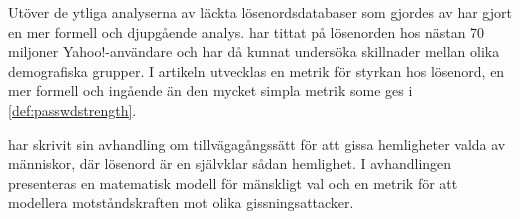 Utöver de ytliga analyserna av läckta lösenordsdatabaser som gjordes av 
\citet{Cubrilovic2009rhf,Oberheide2010bao,Hunt2011abs,Cluley2012twp} har 
\citet{Bonneau2012sog} gjort en mer formell och djupgående analys.
\citeauthor{Bonneau2012sog} har tittat på lösenorden hos nästan 70 miljoner 
Yahoo!-användare och har då kunnat undersöka skillnader mellan olika 
demografiska grupper.
I artikeln utvecklas en metrik för styrkan hos lösenord, en mer formell och 
ingående än den mycket simpla metrik some ges i \cref{def:passwdstrength}.

\citet{Bonneau2012ghs} har skrivit sin avhandling om tillvägagångssätt för att 
gissa hemligheter valda av människor, där lösenord är en självklar sådan 
hemlighet.
I avhandlingen presenteras en matematisk modell för mänskligt val och en metrik 
för att modellera motståndskraften mot olika gissningsattacker.


